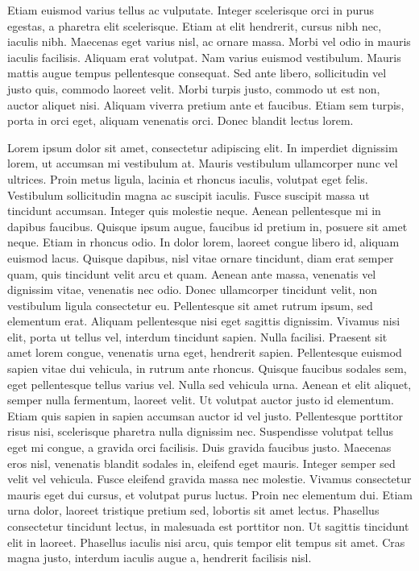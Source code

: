 \documentclass{article}
\begin{document}
Etiam euismod varius tellus ac vulputate. Integer scelerisque orci in purus egestas, a pharetra elit scelerisque. Etiam at elit hendrerit, cursus nibh nec, iaculis nibh. Maecenas eget varius nisl, ac ornare massa. Morbi vel odio in mauris iaculis facilisis. Aliquam erat volutpat. Nam varius euismod vestibulum. Mauris mattis augue tempus pellentesque consequat. Sed ante libero, sollicitudin vel justo quis, commodo laoreet velit. Morbi turpis justo, commodo ut est non, auctor aliquet nisi. Aliquam viverra pretium ante et faucibus. Etiam sem turpis, porta in orci eget, aliquam venenatis orci. Donec blandit lectus lorem.

Lorem ipsum dolor sit amet, consectetur adipiscing elit. In imperdiet dignissim lorem, ut accumsan mi vestibulum at. Mauris vestibulum ullamcorper nunc vel ultrices. Proin metus ligula, lacinia et rhoncus iaculis, volutpat eget felis. Vestibulum sollicitudin magna ac suscipit iaculis. Fusce suscipit massa ut tincidunt accumsan. Integer quis molestie neque. Aenean pellentesque mi in dapibus faucibus.
Quisque ipsum augue, faucibus id pretium in, posuere sit amet neque. Etiam in rhoncus odio. In dolor lorem, laoreet congue libero id, aliquam euismod lacus. Quisque dapibus, nisl vitae ornare tincidunt, diam erat semper quam, quis tincidunt velit arcu et quam. Aenean ante massa, venenatis vel dignissim vitae, venenatis nec odio. Donec ullamcorper tincidunt velit, non vestibulum ligula consectetur eu. Pellentesque sit amet rutrum ipsum, sed elementum erat. Aliquam pellentesque nisi eget sagittis dignissim. Vivamus nisi elit, porta ut tellus vel, interdum tincidunt sapien. Nulla facilisi. Praesent sit amet lorem congue, venenatis urna eget, hendrerit sapien. Pellentesque euismod sapien vitae dui vehicula, in rutrum ante rhoncus. Quisque faucibus sodales sem, eget pellentesque tellus varius vel. Nulla sed vehicula urna. Aenean et elit aliquet, semper nulla fermentum, laoreet velit.
Ut volutpat auctor justo id elementum. Etiam quis sapien in sapien accumsan auctor id vel justo. Pellentesque porttitor risus nisi, scelerisque pharetra nulla dignissim nec. Suspendisse volutpat tellus eget mi congue, a gravida orci facilisis. Duis gravida faucibus justo. Maecenas eros nisl, venenatis blandit sodales in, eleifend eget mauris. Integer semper sed velit vel vehicula. Fusce eleifend gravida massa nec molestie. Vivamus consectetur mauris eget dui cursus, et volutpat purus luctus. Proin nec elementum dui. Etiam urna dolor, laoreet tristique pretium sed, lobortis sit amet lectus. Phasellus consectetur tincidunt lectus, in malesuada est porttitor non. Ut sagittis tincidunt elit in laoreet. Phasellus iaculis nisi arcu, quis tempor elit tempus sit amet. Cras magna justo, interdum iaculis augue a, hendrerit facilisis nisl.
\end{document}
